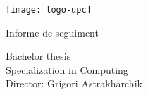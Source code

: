 
\thispagestyle{empty}
\clearpage
\setcounter{page}{-1}

\makeatletter
\begin{titlepage}
{
    \centering
    \texttt{[image: logo-upc]}
    \null
    \vspace{3em}
    {\Huge \bfseries \@title \par}
    \vspace{2em}
    {\large Informe de seguiment\\
    \par}
    \vspace{3em}
    {\large \scshape \@date \par}

    \vfill
    {\raggedleft \large \bfseries \@author \par}
    \vspace{1em}
    {\raggedleft \large
        Bachelor thesis \\
        Specialization in Computing \\
        \vspace{2em}
        Director: Grigori Astrakharchik \\
    \par}
}
\end{titlepage}
\makeatother
